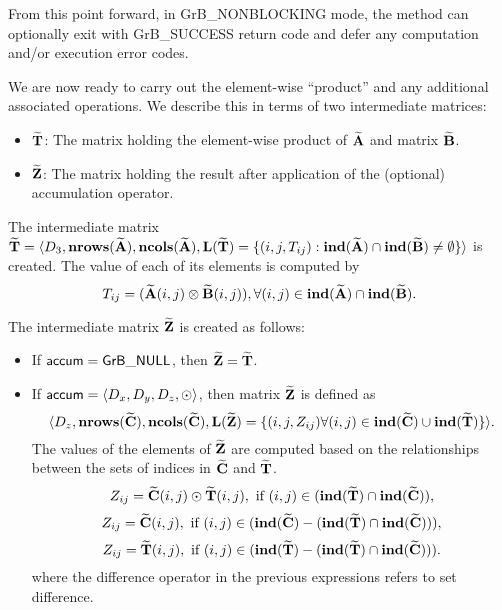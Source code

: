 From this point forward, in {\sf GrB\_NONBLOCKING} mode, the method can 
optionally exit with {\sf GrB\_SUCCESS} return code and defer any computation 
and/or execution error codes.

We are now ready to carry out the element-wise ``product'' and any additional 
associated operations.  We describe this in terms of two intermediate matrices:
\begin{itemize}
	\item ${\bf \widetilde{T}}$: The matrix holding the element-wise product of
    ${\bf \widetilde{A}}$ and matrix ${\bf \widetilde{B}}$.
	\item ${\bf \widetilde{Z}}$: The matrix holding the result after 
    application of the (optional) accumulation operator.
\end{itemize}

The intermediate matrix ${\bf \widetilde{T}} = \langle
D_3, \bold{nrows}({\bf \widetilde{A}}), \bold{ncols}({\bf \widetilde{A}}),
\bold{L}({\bf \widetilde{T}}) =
\{(i,j,T_{ij}) : \bold{ind}({\bf \widetilde{A}}) \cap 
\bold{ind}({\bf \widetilde{B}})
 \neq \emptyset \} \rangle$
is created.  The value of each of its elements is computed by 
\[T_{ij} = ({\bf \widetilde{A}}(i,j)
\otimes {\bf \widetilde{B}}(i,j)), \forall (i,j) \in 
\bold{ind}({\bf \widetilde{A}}) \cap 
\bold{ind}({\bf \widetilde{B}}).\]

The intermediate matrix ${\bf \widetilde{Z}}$ is created as follows:
\begin{itemize}
    \item If ${\sf accum} = {\sf GrB\_NULL}$, then ${\bf \widetilde{Z}} = {\bf \widetilde{T}}$.

    \item If ${\sf accum} = \langle D_x, D_y, D_z, \odot \rangle$, then matrix ${\bf \widetilde{Z}}$ is defined as 
        \[ \langle D_z, \bold{nrows}({\bf \widetilde{C}}), \bold{ncols}({\bf \widetilde{C}}), \bold{L}({\bf \widetilde{Z}})
		= \{(i,j,Z_{ij})  \forall (i,j) \in \bold{ind}({\bf \widetilde{C}}) \cup 
        \bold{ind}({\bf \widetilde{T}}) \} \rangle.\]
    The values of the elements of ${\bf \widetilde{Z}}$ are computed based on the 
    relationships between the sets of indices in ${\bf \widetilde{C}}$ and 
    ${\bf \widetilde{T}}$.
\[
Z_{ij} = {\bf \widetilde{C}}(i,j) \odot {\bf \widetilde{T}}(i,j), \ \mbox{if}\  (i,j) \in  (\bold{ind}({\bf \widetilde{T}}) \cap \bold{ind}({\bf \widetilde{C}})),
\]
\[
Z_{ij} = \matrix{\widetilde{C}}(i,j), \ \mbox{if}\  (i,j) \in  (\bold{ind}(\matrix{\widetilde{C}}) - (\bold{ind}(\matrix{\widetilde{T}}) \cap \bold{ind}(\matrix{\widetilde{C}}))),
\]
\[
Z_{ij} = \matrix{\widetilde{T}}(i,j), \ \mbox{if}\  (i,j) \in  (\bold{ind}(\matrix{\widetilde{T}}) - (\bold{ind}(\matrix{\widetilde{T}}) \cap \bold{ind}(\matrix{\widetilde{C}}))).
\]
where the difference operator in the previous expressions refers to set difference.
\end{itemize}


